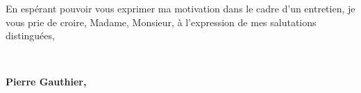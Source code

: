 \documentclass{cv_style}
\begin{document}
En espérant pouvoir vous exprimer ma motivation dans le cadre d’un entretien, je vous prie de croire, Madame, Monsieur, à l’expression de mes salutations distinguées, 

\vspace{1cm}\\
\begin{flushright}
\parbox{5cm}{
\centering
    \textbf{Pierre Gauthier,}\\
}
\end{flushright}
\end{document}

